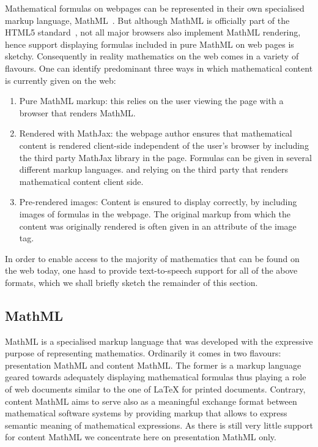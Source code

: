\documentclass{sig-alternate}
\begin{document}
Mathematical formulas on webpages can be represented in their own specialised
markup language, MathML~\cite{MathML3}. But although MathML is officially part
of the HTML5 standard~\cite{HTML5}, not all major browsers also implement MathML
rendering, hence support displaying formulas included in pure MathML on web
pages is sketchy. Consequently in reality mathematics on the web comes in a
variety of flavours. One can identify predominant three ways in which
mathematical content is currently given on the web:
\begin{enumerate}
\item Pure MathML markup: this relies on the user viewing the
  page with a browser that renders MathML.
\item Rendered with MathJax: the webpage author ensures that mathematical
  content is rendered client-side independent of the user's browser by including
  the third party MathJax library in the page. Formulas can be given in several
  different markup languages.  and relying on the third party that renders
  mathematical content client side.
\item Pre-rendered images: Content is ensured to display correctly, by including
  images of formulas in the webpage. The original markup from which the content
  was originally rendered is often given in an attribute of the image tag.
\end{enumerate}

In order to enable access to the majority of mathematics that can be found on
the web today, one hasd to provide text-to-speech support for all of the above
formats, which we shall briefly sketch the remainder of this section.

\subsection{MathML}
\label{sec:mathml}

MathML is a specialised markup language that was developed with the expressive
purpose of representing mathematics. Ordinarily it comes in two flavours:
presentation MathML and content MathML. The former is a markup language geared
towards adequately displaying mathematical formulas thus playing a role of web
documents similar to the one of {\LaTeX} for printed documents.  Contrary,
content MathML aims to serve also as a meaningful exchange format between
mathematical software systems by providing markup that allows to express
semantic meaning of mathematical expressions. As there is still very little
support for content MathML we concentrate here on presentation MathML only.
  
\end{document}
